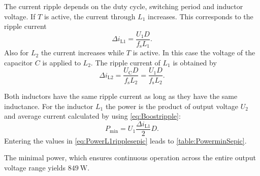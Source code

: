 
\begin{solutionblock}
    The current ripple depends on the duty cycle, switching period and inductor voltage. 
    If $T$ is active, the current through $L_1$ increases. This corresponds to the ripple current
    \begin{equation}
        \Delta i_\mathrm{L1}=\frac{U_\mathrm{1}D}{f_\mathrm{s}L_\mathrm{1}}.
    \end{equation}
    Also for $L_2$ the current increases while $T$ is active. In this case the voltage of the capacitor $C$ is applied to $L_2$.
    The ripple current of $L_1$ is obtained by
    \begin{equation}
        \Delta i_\mathrm{L2}=\frac{U_\mathrm{C}D}{f_\mathrm{s}L_\mathrm{2}}=\frac{U_\mathrm{1}D}{f_\mathrm{s}L_\mathrm{2}}.
    \end{equation}
\end{solutionblock}


\begin{solutionblock}
    Both inductors have the same ripple current as long as they have the same inductance.
    For the inductor $L_1$ the power is the product of output voltage
     $U_\mathrm{2}$ and average current calculated by using \eqref{eq:Boostripple}:
    \begin{equation}
        P_\mathrm{min}=U_\mathrm{1}\frac{\Delta i_\mathrm{L1}}{2}D.
        \label{eq:PowerL1ripplesepic}
    \end{equation}
    Entering the values in \eqref{eq:PowerL1ripplesepic} leads to \autoref{table:PowerminSepic}.
    
    The minimal power, which ensures continuous operation across the entire output voltage range
    yields  $\SI{849}{\watt}$.

\end{solutionblock}




